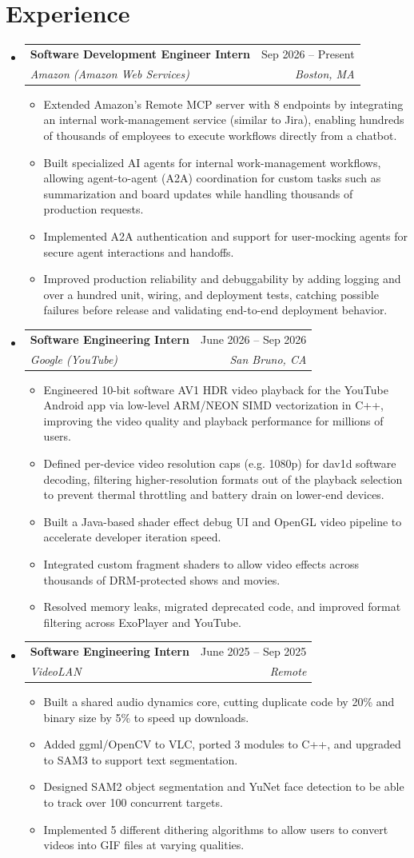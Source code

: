 \documentclass[letterpaper,11pt]{article}
\makeatletter
\newcommand{\resumeItem}[1]{
    \item\small{
            {#1 \vspace{-2pt}}
    }
}
\newcommand{\resumeSubheading}[4]{
    \vspace{-2pt}\item
    \begin{tabular*}{0.97\textwidth}[t]{l@{\extracolsep{\fill}}r}
    \textbf{#1} & #2 \\
    \textit{\small#3} & \textit{\small #4} \\
    \end{tabular*}\vspace{-7pt}
}
\newcommand{\resumeSubHeadingListStart}{\begin{itemize}[leftmargin=0.15in, label={}]}
\newcommand{\resumeSubHeadingListEnd}{\end{itemize}}
\newcommand{\resumeItemListStart}{\begin{itemize}}
\newcommand{\resumeItemListEnd}{\end{itemize}\vspace{-5pt}}
\makeatother
\begin{document}
    \section{Experience}
    \resumeSubHeadingListStart
    \resumeSubheading
    {Software Development Engineer Intern}{Sep 2026 -- Present}
    {Amazon (Amazon Web Services)}{Boston, MA}
    \resumeItemListStart
    \resumeItem{Extended Amazon’s Remote MCP server with 8 endpoints by integrating an internal work-management service (similar to Jira), enabling hundreds of thousands of employees to execute workflows directly from a chatbot.}
    \resumeItem{Built specialized AI agents for internal work-management workflows, allowing agent-to-agent (A2A) coordination for custom tasks such as summarization and board updates while handling thousands of production requests.}
    \resumeItem{Implemented A2A authentication and support for user-mocking agents for secure agent interactions and handoffs.}
    \resumeItem{Improved production reliability and debuggability by adding logging and over a hundred unit, wiring, and deployment tests, catching possible failures before release and validating end-to-end deployment behavior.}
    \resumeItemListEnd
    \vspace{1mm}
    \resumeSubheading
    {Software Engineering Intern}{June 2026 -- Sep 2026}
    {Google (YouTube)}{San Bruno, CA}
    \resumeItemListStart
    \resumeItem{Engineered 10-bit software AV1 HDR video playback for the YouTube Android app via low-level ARM/NEON SIMD vectorization in C++, improving the video quality and playback performance for millions of users.}
    \resumeItem{Defined per-device video resolution caps (e.g. 1080p) for dav1d software decoding, filtering higher-resolution formats out of the playback selection to prevent thermal throttling and battery drain on lower-end devices.}
    \resumeItem{Built a Java-based shader effect debug UI and OpenGL video pipeline to accelerate developer iteration speed.}
    \resumeItem{Integrated custom fragment shaders to allow video effects across thousands of DRM-protected shows and movies.}
    \resumeItem{Resolved memory leaks, migrated deprecated code, and improved format filtering across ExoPlayer and YouTube.}
    \resumeItemListEnd
    \vspace{1mm}
    \resumeSubheading
    {Software Engineering Intern}{June 2025 -- Sep 2025}
    {VideoLAN}{Remote}
    \resumeItemListStart
    \resumeItem{Built a shared audio dynamics core, cutting duplicate code by 20\% and binary size by 5\% to speed up downloads.}
    \resumeItem{Added ggml/OpenCV to VLC, ported 3 modules to C++, and upgraded to SAM3 to support text segmentation.}
    \resumeItem{Designed SAM2 object segmentation and YuNet face detection to be able to track over 100 concurrent targets.}
    \resumeItem{Implemented 5 different dithering algorithms to allow users to convert videos into GIF files at varying qualities.}
    \resumeItemListEnd
    \resumeSubHeadingListEnd
\end{document}
